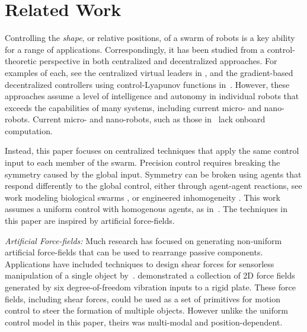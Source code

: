 
\section{Related Work}\label{sec:RelatedWork}

Controlling the \emph{shape}, or relative positions, of a swarm of robots is a key ability for a range of applications.  Correspondingly, it has been studied from a control-theoretic perspective in  both centralized and decentralized approaches. For examples of each, see the centralized virtual leaders in \cite{egerstedt2001formation}, and the  gradient-based decentralized controllers  using control-Lyapunov functions in~\cite{hsieh2008decentralized}. However, these approaches assume a level of intelligence and autonomy in individual robots that exceeds the capabilities of many systems, including current micro- and nano-robots.  Current micro- and nano-robots, such as those in~\cite{Chowdhury2015,martel2015magnetotactic,Xiaohui2015magnetiteMicroswimmers} lack onboard computation.

Instead, this paper focuses on centralized techniques that apply the same control input to each member of the swarm. 
Precision control requires breaking the symmetry caused by the global input.  
Symmetry can be broken using agents that respond differently to the global control, either through agent-agent reactions, see work modeling biological swarms \cite{bertozzi2015ring}, or engineered inhomogeneity  \cite{Donald2013,bretl2007,beckerIJRR2014}.
This work assumes a uniform control with homogenous agents, as in~\cite{Becker2013b}. 
The techniques in this paper are inspired by artificial force-fields. 


\emph{Artificial Force-fields:}
Much research has focused on generating non-uniform artificial force-fields that can be used to rearrange passive components.  Applications have included techniques to design shear forces for sensorless manipulation of a single object by~\cite{lamiraux+2001:ra}.  
\cite{Vose2009a,vose2012sliding} demonstrated a collection of 2D force fields generated by six degree-of-freedom vibration inputs to a rigid plate.  These force fields, including shear forces, could be used as a set of primitives for motion control to steer the formation of multiple objects. However unlike the uniform control model in this paper, theirs was multi-modal and position-dependent.

